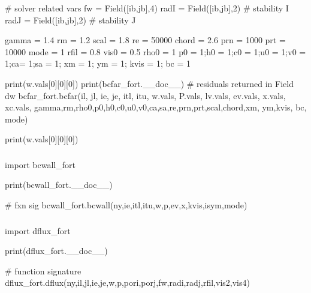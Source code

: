 \documentclass[letterpaper,10pt,english]{sphinxmanual}
\begin{document}
\sphinxAtStartPar
\# solver related vars
fw = Field({[}ib,jb{]},4)
radI = Field({[}ib,jb{]},2) \# stability I
radJ = Field({[}ib,jb{]},2) \# stability J

\sphinxAtStartPar
gamma = 1.4
rm = 1.2
scal = 1.8
re = 50000
chord = 2.6
prn = 1000
prt = 10000
mode = 1
rfil = 0.8
vis0 = 0.5
rho0 = 1
p0 = 1;h0 = 1;c0 = 1;u0 = 1;v0 = 1;ca= 1;sa = 1; xm = 1; ym = 1; kvis = 1; bc = 1

\sphinxAtStartPar
print(w.vals{[}0{]}{[}0{]}{[}0{]})
print(bcfar\_fort.\_\_doc\_\_)
\# residuals returned in Field dw
bcfar\_fort.bcfar(il, jl, ie, je, itl, itu,       w.vals, P.vals, lv.vals, ev.vals,        x.vals, xc.vals,       gamma,rm,rho0,p0,h0,c0,u0,v0,ca,sa,re,prn,prt,scal,chord,xm,       ym,kvis,       bc,       mode)

\sphinxAtStartPar
print(w.vals{[}0{]}{[}0{]}{[}0{]})


\subsubsection{}
\label{\detokenize{autoapi/tests/test_bcwall/index:module-tests.test_bcwall}}\label{\detokenize{autoapi/tests/test_bcwall/index:tests-test-bcwall}}\label{\detokenize{autoapi/tests/test_bcwall/index::doc}}
\sphinxAtStartPar
import bcwall\_fort

\sphinxAtStartPar
print(bcwall\_fort.\_\_doc\_\_)

\sphinxAtStartPar
\# fxn sig
bcwall\_fort.bcwall(ny,ie,itl,itu,w,p,ev,x,kvis,isym,mode)


\subsubsection{}
\label{\detokenize{autoapi/tests/test_dflux/index:module-tests.test_dflux}}\label{\detokenize{autoapi/tests/test_dflux/index:tests-test-dflux}}\label{\detokenize{autoapi/tests/test_dflux/index::doc}}
\sphinxAtStartPar
import dflux\_fort

\sphinxAtStartPar
print(dflux\_fort.\_\_doc\_\_)

\sphinxAtStartPar
\# function signature
dflux\_fort.dflux(ny,il,jl,ie,je,w,p,pori,porj,fw,radi,radj,rfil,vis2,vis4)
\end{document}
